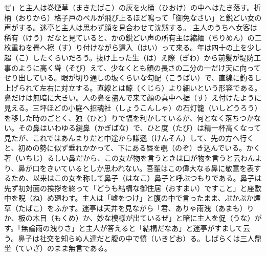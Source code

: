 \documentclass{book}
\begin{document}
ぜ」と主人は巻煙草（まきたばこ）の灰を火桶（ひおけ）の中へはたき落す。折柄（おりから）格子戸のベルが飛び上るほど鳴って「御免なさい」と鋭どい女の声がする。迷亭と主人は思わず顔を見合わせて沈黙する。
主人のうちへ女客は稀有（けう）だなと見ていると、かの鋭どい声の所有主は縮緬（ちりめん）の二枚重ねを畳へ擦（す）り付けながら這入（はい）って来る。年は四十の上を少し超（こ）したくらいだろう。抜け上った生（は）え際（ぎわ）から前髪が堤防工事のように高く聳（そび）えて、少なくとも顔の長さの二分の一だけ天に向ってせり出している。眼が切り通しの坂くらいな勾配（こうばい）で、直線に釣るし上げられて左右に対立する。直線とは鯨（くじら）より細いという形容である。鼻だけは無暗に大きい。人の鼻を盗んで来て顔の真中へ据（す）え付けたように見える。三坪ほどの小庭へ招魂社（しょうこんしゃ）の石灯籠（いしどうろう）を移した時のごとく、独（ひと）りで幅を利かしているが、何となく落ちつかない。その鼻はいわゆる鍵鼻（かぎばな）で、ひと度（たび）は精一杯高くなって見たが、これではあんまりだと中途から謙遜（けんそん）して、先の方へ行くと、初めの勢に似ず垂れかかって、下にある唇を覗（のぞ）き込んでいる。かく著（いちじ）るしい鼻だから、この女が物を言うときは口が物を言うと云わんより、鼻が口をきいているとしか思われない。吾輩はこの偉大なる鼻に敬意を表するため、以来はこの女を称して鼻子（はなこ）鼻子と呼ぶつもりである。鼻子は先ず初対面の挨拶を終って「どうも結構な御住居（おすまい）ですこと」と座敷中を睨（ね）め廻わす。主人は「嘘をつけ」と腹の中で言ったまま、ぷかぷか煙草（たばこ）をふかす。迷亭は天井を見ながら「君、ありゃ雨洩（あまも）りか、板の木目（もくめ）か、妙な模様が出ているぜ」と暗に主人を促（うな）がす。「無論雨の洩りさ」と主人が答えると「結構だなあ」と迷亭がすまして云う。鼻子は社交を知らぬ人達だと腹の中で憤（いきどお）る。しばらくは三人鼎坐（ていざ）のまま無言である。
\end{document}
